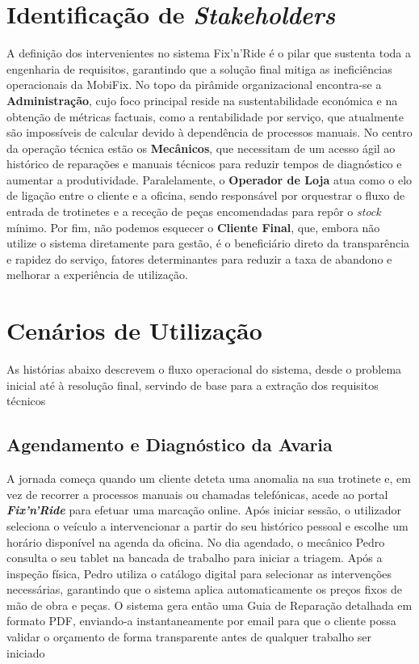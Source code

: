 \documentclass[a4paper,12pt]{scrreprt}
\begin{document}
\section{Identificação de \textit{Stakeholders}}
A definição dos intervenientes no sistema Fix'n'Ride é o pilar que sustenta toda a engenharia de requisitos, garantindo que a solução final mitiga as ineficiências operacionais da MobiFix. No topo da pirâmide organizacional encontra-se a \textbf{Administração}, cujo foco principal reside na sustentabilidade económica e na obtenção de métricas factuais, como a rentabilidade por serviço, que atualmente são impossíveis de calcular devido à dependência de processos manuais. No centro da operação técnica estão os \textbf{Mecânicos}, que necessitam de um acesso ágil ao histórico de reparações e manuais técnicos para reduzir tempos de diagnóstico e aumentar a produtividade. Paralelamente, o \textbf{Operador de Loja} atua como o elo de ligação entre o cliente e a oficina, sendo responsável por orquestrar o fluxo de entrada de trotinetes e a receção de peças encomendadas para repôr o \textit{stock} mínimo. Por fim, não podemos esquecer o \textbf{Cliente Final}, que, embora não utilize o sistema diretamente para gestão, é o beneficiário direto da transparência e rapidez do serviço, fatores determinantes para reduzir a taxa de abandono e melhorar a experiência de utilização. 

\section{Cenários de Utilização}
As histórias abaixo descrevem o fluxo operacional do sistema, desde o problema inicial até à resolução final, servindo de base para a extração dos requisitos técnicos

\subsection{Agendamento e Diagnóstico da Avaria}
A jornada começa quando um cliente deteta uma anomalia na sua trotinete e, em vez de recorrer a processos manuais ou chamadas telefónicas, acede ao portal \textbf{\textit{Fix'n'Ride}} para efetuar uma marcação online. Após iniciar sessão, o utilizador seleciona o veículo a intervencionar a partir do seu histórico pessoal e escolhe um horário disponível na agenda da oficina. No dia agendado, o mecânico Pedro consulta o seu tablet na bancada de trabalho para iniciar a triagem. Após a inspeção física, Pedro utiliza o catálogo digital para selecionar as intervenções necessárias, garantindo que o sistema aplica automaticamente os preços fixos de mão de obra e peças. O sistema gera então uma Guia de Reparação detalhada em formato PDF, enviando-a instantaneamente por email para que o cliente possa validar o orçamento de forma transparente antes de qualquer trabalho ser iniciado
    
\end{document}
